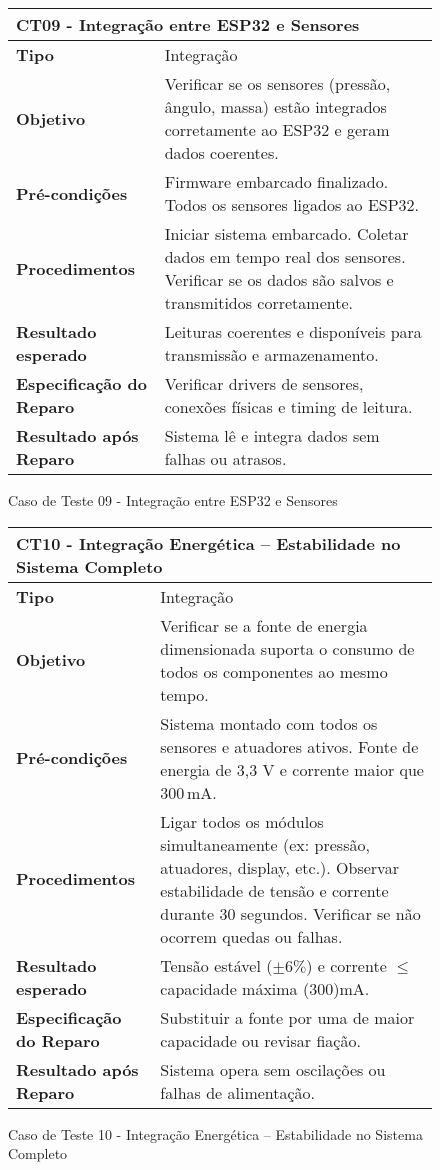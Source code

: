 \begin{figure}[H]
    \centering
\begin{longtable}{|p{}|p{}|}
\hline
\multicolumn{2}{|l|}{\textbf{CT09 - Integração entre ESP32 e Sensores}} \\
\hline
\textbf{Tipo} & Integração \\
\hline
\textbf{Objetivo} & Verificar se os sensores (pressão, ângulo, massa) estão integrados corretamente ao ESP32 e geram dados coerentes. \\
\hline
\textbf{Pré-condições} & Firmware embarcado finalizado.  Todos os sensores ligados ao ESP32. \\
\hline
\textbf{Procedimentos} & Iniciar sistema embarcado.  Coletar dados em tempo real dos sensores.  Verificar se os dados são salvos e transmitidos corretamente. \\
\hline
\textbf{Resultado esperado} & Leituras coerentes e disponíveis para transmissão e armazenamento. \\
\hline
\textbf{Especificação do Reparo} & Verificar drivers de sensores, conexões físicas e timing de leitura. \\
\hline
\textbf{Resultado após Reparo} & Sistema lê e integra dados sem falhas ou atrasos. \\
\hline
\end{longtable}
\caption{Caso de Teste 09 - Integração entre ESP32 e Sensores}
\label{fig_ct24_integracao_esp32_sensores}
\end{figure}

\begin{figure}[H]
    \centering
\begin{longtable}{|p{}|p{}|}
\hline
\multicolumn{2}{|l|}{\textbf{CT10 - Integração Energética – Estabilidade no Sistema Completo}} \\
\hline
\textbf{Tipo} & Integração \\
\hline
\textbf{Objetivo} & Verificar se a fonte de energia dimensionada suporta o consumo de todos os componentes ao mesmo tempo. \\
\hline
\textbf{Pré-condições} & Sistema montado com todos os sensores e atuadores ativos.  Fonte de energia de 3,3 V e corrente maior que 300\,mA. \\
\hline
\textbf{Procedimentos} & Ligar todos os módulos simultaneamente (ex: pressão, atuadores, display, etc.).  Observar estabilidade de tensão e corrente durante 30 segundos.  Verificar se não ocorrem quedas ou falhas. \\
\hline
\textbf{Resultado esperado} & Tensão estável ($\pm 6\%$) e corrente $\le$ capacidade máxima ($300$)mA. \\
\hline
\textbf{Especificação do Reparo} & Substituir a fonte por uma de maior capacidade ou revisar fiação. \\
\hline
\textbf{Resultado após Reparo} & Sistema opera sem oscilações ou falhas de alimentação. \\
\hline
\end{longtable}
\caption{Caso de Teste 10 - Integração Energética – Estabilidade no Sistema Completo}
\label{fig_ct26_integracao_energetica_estabilidade_sistema_completo}
\end{figure}

